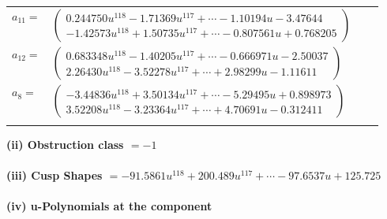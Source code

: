 \documentclass[1p]{elsarticle_modified}
\theoremstyle{definition}
\begin{document}
\begin{tabular}{m{7pt} m{180pt} m{7pt} m{180pt} }
\flushright $a_{11}=$&$\begin{pmatrix}0.244750 u^{118}-1.71369 u^{117}+\cdots-1.10194 u-3.47644\\-1.42573 u^{118}+1.50735 u^{117}+\cdots-0.807561 u+0.768205\end{pmatrix}$ \\
\flushright $a_{12}=$&$\begin{pmatrix}0.683348 u^{118}-1.40205 u^{117}+\cdots-0.666971 u-2.50037\\2.26430 u^{118}-3.52278 u^{117}+\cdots+2.98299 u-1.11611\end{pmatrix}$ \\
\flushright $a_{8}=$&$\begin{pmatrix}-3.44836 u^{118}+3.50134 u^{117}+\cdots-5.29495 u+0.898973\\3.52208 u^{118}-3.23364 u^{117}+\cdots+4.70691 u-0.312411\end{pmatrix}$\\&\end{tabular}
\flushleft \textbf{(ii) Obstruction class $= -1$}\\~\\
\flushleft \textbf{(iii) Cusp Shapes $= -91.5861 u^{118}+200.489 u^{117}+\cdots-97.6537 u+125.725$}\\~\\
\newpage\renewcommand{\arraystretch}{1}
\flushleft \textbf{(iv) u-Polynomials at the component}\newline \\
\end{document}
